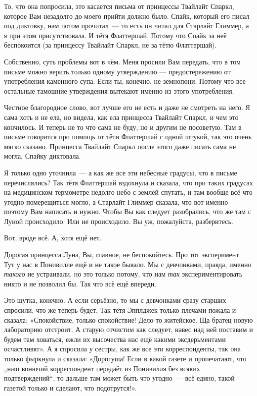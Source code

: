 \documentclass[fontsize=11pt,a5paper,titlepage=firstcover]{scrbook}
\begin{document}
То, что она попросила, это касается письма от принцессы Твайлайт Спаркл, которое Вам незадолго до моего прийти должно было. Спайк, который его писал под диктовку, нам потом прочитал~--- то есть он читал для Старлайт Глиммер, а я при этом присутствовала. И тётя Флаттершай. Потому что Спайк за неё беспокоится (за принцессу Твайлайт Спаркл, не за тётю Флаттершай).

Собственно, суть проблемы вот в чём. Меня просили Вам передать, что в том письме можно верить только одному утверждению --- предостережению от употребления каменного супа. Если ты, конечно, не земнопони. Потому что все остальные тамошние утверждения вытекают именно из этого употребления.

Честное благородное слово, вот лучше его не есть и даже не смотреть на него. Я сама хоть и не ела, но видела, как ела принцесса Твайлайт Спаркл, и чем это кончилось. И теперь не то что сама не буду, но и другим не посоветую. Там в письме говорится про помощь от тёти Флаттершай с одной штукой, так это очень мягко сказано. Принцесса Твайлайт Спаркл после этого даже писать сама не могла, Спайку диктовала.

Я только одно уточнила~--- а как же все эти небесные градусы, что в письме перечислялись? Так тётя Флаттершай вздохнула и сказала, что при таких градусах на медицинском термометре недолго небо с землёй спутать, и там вообще всё что угодно померещиться могло, а Старлайт Глиммер сказала, что вот именно поэтому Вам написать и нужно. Чтобы Вы как следует разобрались, что же там с Луной происходило. Или не происходило. Вы уж, пожалуйста, разберитесь.

Вот, вроде всё. А, хотя ещё нет.

Дорогая принцесса Луна, Вы, главное, не беспокойтесь. Про тот эксперимент. Тут у нас в Понивилле ещё и не такое бывало. Мы с девчонками, правда, именно \emph{такого} не устраивали, но это только потому, что нам \emph{так} экспериментировать никто и не позволил бы. Так что всё ещё впереди.

Это шутка, конечно. А если серьёзно, то мы с девчонками сразу старших спросили, что же теперь будет. Так тётя Эпплджек только плечами пожала и сказала: «Спокойствие, только спокойствие! Дело-то житейское. Ща братец новую лабораторию отстроит. А старую отчистим как следует, навес над ней поставим и будем там ховаться, ежли их высочества нас ещё какими эксдерьментами осчастливят». А я спросила у сестры, как же все эти корреспонденты, так она только фыркнула и сказала: «Дорогуша! Если в какой газете и пропечатают, что „наш вонючий корреспондент передаёт из Понивилля без всяких подтверждений“, то дальше там может быть что угодно~--- всё едино, такой газетой только и сделают, что подотрутся!».
\end{document}
